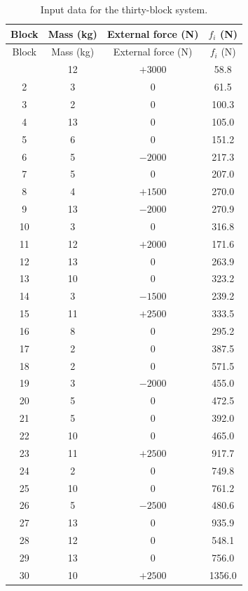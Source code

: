 \documentclass[11pt,a4paper]{article}
\begin{document}
\begin{longtable}{c c c c}
\caption{Input data for the thirty-block system.}\label{tab:input}\\
\toprule
Block & Mass (kg) & External force (N) & $f_i$ (N) \\
\midrule
\endfirsthead
\toprule
Block & Mass (kg) & External force (N) & $f_i$ (N) \\
\midrule
\endhead
\midrule
\endfoot
\bottomrule
\endlastfoot
1  & 12 & $+3000$ & 58.8 \\
2  & 3  & $0$     & 61.5 \\
3  & 2  & $0$     & 100.3 \\
4  & 13 & $0$     & 105.0 \\
5  & 6  & $0$     & 151.2 \\
6  & 5  & $-2000$ & 217.3 \\
7  & 5  & $0$     & 207.0 \\
8  & 4  & $+1500$ & 270.0 \\
9  & 13 & $-2000$ & 270.9 \\
10 & 3  & $0$     & 316.8 \\
11 & 12 & $+2000$ & 171.6 \\
12 & 13 & $0$     & 263.9 \\
13 & 10 & $0$     & 323.2 \\
14 & 3  & $-1500$ & 239.2 \\
15 & 11 & $+2500$ & 333.5 \\
16 & 8  & $0$     & 295.2 \\
17 & 2  & $0$     & 387.5 \\
18 & 2  & $0$     & 571.5 \\
19 & 3  & $-2000$ & 455.0 \\
20 & 5  & $0$     & 472.5 \\
21 & 5  & $0$     & 392.0 \\
22 & 10 & $0$     & 465.0 \\
23 & 11 & $+2500$ & 917.7 \\
24 & 2  & $0$     & 749.8 \\
25 & 10 & $0$     & 761.2 \\
26 & 5  & $-2500$ & 480.6 \\
27 & 13 & $0$     & 935.9 \\
28 & 12 & $0$     & 548.1 \\
29 & 13 & $0$     & 756.0 \\
30 & 10 & $+2500$ & 1356.0 \\
\end{longtable}
\end{document}
